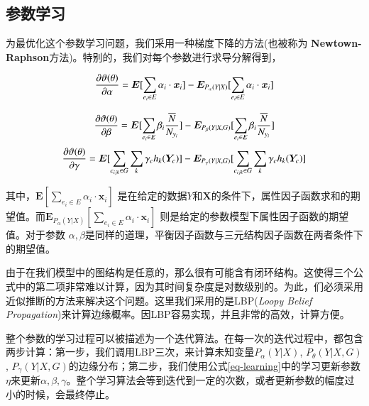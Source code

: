 \subsection{参数学习}
为最优化这个参数学习问题，我们采用一种梯度下降的方法(也被称为 \textbf{Newtown-Raphson}方法)。特别的，我们对每个参数进行求导分解得到，



\begin{equation}
\frac{\partial \vartheta(\theta)}{\partial \alpha}=\bm{E}[\sum_{e_i \in E}\alpha_i \cdot \bm{x}_i] -  \bm{E}_{P_{\alpha}(Y|X)}[\sum_{e_i \in E}\alpha_i \cdot \bm{x}_i]  \\ 
\end{equation}

\begin{equation}
 \frac{\partial \vartheta(\theta)}{\partial \beta}=\bm{E}[\sum_{e_i \in E}\beta_i \frac{\overline{N}}{N_{y_i}}] -  \bm{E}_{P_{\beta}(Y|X,G)}[\sum_{e_i \in E}\beta_i \frac{\overline{N}}{N_{y_i}}] \\
 \end{equation}
\begin{equation}
    \frac{\partial \vartheta(\theta)}{\partial \gamma}=\bm{E}[\sum_{c_{ijk} \in G} \sum_{k}\gamma_c h_k (\bm{Y}_c) ] -  \bm{E}_{P_{\gamma}(Y|X,G)}[\sum_{c_{ijk} \in G} \sum_{k}\gamma_c h_k (\bm{Y}_c) ]  \\
\end{equation}

其中，$\bm{E}[\sum_{e_i \in E}\alpha_i \cdot \bm{x}_i]$ 是在给定的数据$Y$和$\bm{X}$的条件下，属性因子函数求和的期望值。而$\bm{E}_{P_{\alpha}(Y|X)}[\sum_{e_i \in E}\alpha_i \cdot \bm{x}_i]$ 则是给定的参数模型下属性因子函数的期望值。对于参数 $\alpha, \beta$是同样的道理，平衡因子函数与三元结构因子函数在两者条件下的期望值。

由于在我们模型中的图结构是任意的，那么很有可能含有闭环结构。这使得三个公式中的第二项非常难以计算，因为其时间复杂度是对数级别的。为此，们必须采用近似推断的方法来解决这个问题。这里我们采用的是LBP(\textit{Loopy Belief Propagation})来计算边缘概率。因LBP容易实现，并且非常的高效，计算方便。

整个参数的学习过程可以被描述为一个迭代算法。在每一次的迭代过程中，都包含两步计算：第一步，我们调用LBP三次，来计算未知变量$P_{\alpha}(Y|X)$, $P_{\theta}(Y|X,G)$ , $P_{\gamma}(Y|X,G)$的边缘分布；第二步，我们使用公式\ref{eq-learning}中的学习更新参数$\eta$来更新$\alpha,\beta, \gamma$。整个学习算法会等到迭代到一定的次数，或者更新参数的幅度过小的时候，会最终停止。


